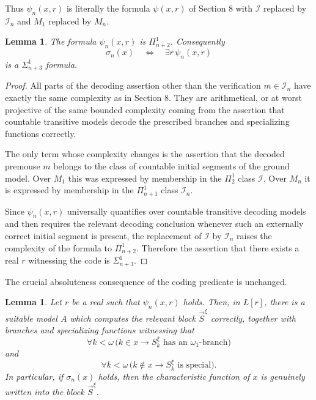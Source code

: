 \documentclass[a4paper,11pt]{article}
\newtheorem{lemma}[theorem]{Lemma}
\begin{document}
Thus $\psi_n(x,r)$ is literally the formula $\psi(x,r)$ of Section 8 with
$\mathcal I$ replaced by $\mathcal I_n$ and $M_1$ replaced by $M_n$.

\begin{lemma}\label{complexity-of-psi-n}
The formula $\psi_n(x,r)$ is $\Pi^1_{n+2}$. Consequently
\[
\sigma_n(x)\quad\Longleftrightarrow\quad \exists r\,\psi_n(x,r)
\]
is a $\Sigma^1_{n+3}$ formula.
\end{lemma}

\begin{proof}
All parts of the decoding assertion other than the verification
$m\in\mathcal I_n$ have exactly the same complexity as in Section 8. They are
arithmetical, or at worst projective of the same bounded complexity coming
from the assertion that countable transitive models decode the prescribed
branches and specializing functions correctly.

The only term whose complexity changes is the assertion that the decoded
premouse $m$ belongs to the class of countable initial segments of the ground
model. Over $M_1$ this was expressed by membership in the
$\Pi^1_2$ class $\mathcal I$. Over $M_n$ it is expressed by membership in
the $\Pi^1_{n+1}$ class $\mathcal I_n$.

Since $\psi_n(x,r)$ universally quantifies over countable transitive
decoding models and then requires the relevant decoding conclusion whenever
such an externally correct initial segment is present, the replacement of
$\mathcal I$ by $\mathcal I_n$ raises the complexity of the formula to
$\Pi^1_{n+2}$. Therefore the assertion that there exists a real $r$
witnessing the code is $\Sigma^1_{n+3}$.
\end{proof}

The crucial absoluteness consequence of the coding predicate is unchanged.

\begin{lemma}\label{Mn-coded-real-is-really-coded}
Let $r$ be a real such that $\psi_n(x,r)$ holds. Then, in $L[r]$, there is a
suitable model $A$ which computes the relevant block $\vec S^\xi$ correctly,
together with branches and specializing functions witnessing that
\[
\forall k<\omega\,
\bigl(k\in x\rightarrow S^\xi_k
\text{ has an }\omega_1\text{-branch}\bigr)
\]
and
\[
\forall k<\omega\,
\bigl(k\notin x\rightarrow S^\xi_k
\text{ is special}\bigr).
\]
In particular, if $\sigma_n(x)$ holds, then the characteristic function of
$x$ is genuinely written into the block $\vec S^\xi$.
\end{lemma}
\end{document}
